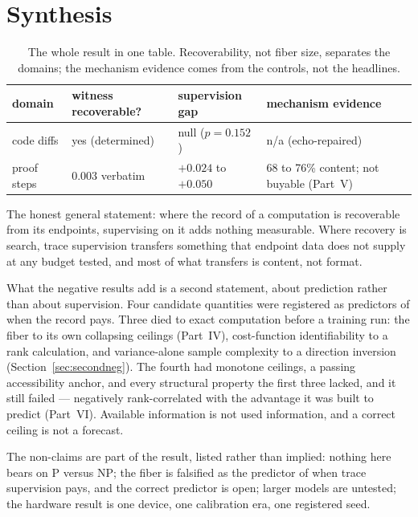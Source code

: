\section{Synthesis}\label{sec:synthesis}

\begin{table}[htbp]
\centering\small
\caption{The whole result in one table. Recoverability, not fiber size, separates the domains; the mechanism evidence comes from the controls, not the headlines.}
\label{tab:synthesis}
\begin{tabular}{llll}
\toprule
domain & witness recoverable? & supervision gap & mechanism evidence \\
\midrule
code diffs & yes (determined) & null ($p = 0.152$) & n/a (echo-repaired) \\
proof steps & 0.003 verbatim & $+0.024$ to $+0.050$ & 68 to 76\% content; not buyable (Part~V) \\
\bottomrule
\end{tabular}
\end{table}

The honest general statement: where the record of a computation is recoverable from its endpoints, supervising on it adds nothing measurable. Where recovery is search, trace supervision transfers something that endpoint data does not supply at any budget tested, and most of what transfers is content, not format.

What the negative results add is a second statement, about prediction rather than about supervision. Four candidate quantities were registered as predictors of when the record pays. Three died to exact computation before a training run: the fiber to its own collapsing ceilings (Part~IV), cost-function identifiability to a rank calculation, and variance-alone sample complexity to a direction inversion (Section~\ref{sec:secondneg}). The fourth had monotone ceilings, a passing accessibility anchor, and every structural property the first three lacked, and it still failed --- negatively rank-correlated with the advantage it was built to predict (Part~VI). Available information is not used information, and a correct ceiling is not a forecast.

The non-claims are part of the result, listed rather than implied: nothing here bears on P versus NP; the fiber is falsified as the predictor of when trace supervision pays, and the correct predictor is open; larger models are untested; the hardware result is one device, one calibration era, one registered seed.

